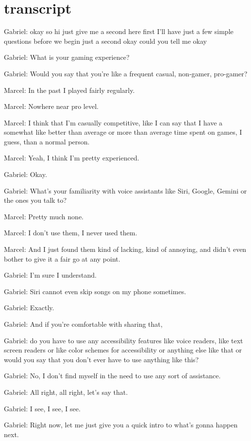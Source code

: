 
\section{transcript}

Gabriel: okay so hi just give me a second here first I'll have just a few simple questions before we begin just a second okay could you tell me okay

Gabriel: What is your gaming experience?

Gabriel: Would you say that you're like a frequent casual, non-gamer, pro-gamer?

Marcel: In the past I played fairly regularly.

Marcel: Nowhere near pro level.

Marcel: I think that I'm casually competitive, like I can say that I have a somewhat like better than average or more than average time spent on games, I guess, than a normal person.

Marcel: Yeah, I think I'm pretty experienced.

Gabriel: Okay.

Gabriel: What's your familiarity with voice assistants like Siri, Google, Gemini or the ones you talk to?

Marcel: Pretty much none.

Marcel: I don't use them, I never used them.

Marcel: And I just found them kind of lacking, kind of annoying, and didn't even bother to give it a fair go at any point.

Gabriel: I'm sure I understand.

Gabriel: Siri cannot even skip songs on my phone sometimes.

Gabriel: Exactly.

Gabriel: And if you're comfortable with sharing that,

Gabriel: do you have to use any accessibility features like voice readers, like text screen readers or like color schemes for accessibility or anything else like that or would you say that you don't ever have to use anything like this?

Gabriel: No, I don't find myself in the need to use any sort of assistance.

Gabriel: All right, all right, let's say that.

Gabriel: I see, I see, I see.

Gabriel: Right now, let me just give you a quick intro to what's gonna happen next.

